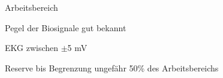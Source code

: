 \documentclass[a4paper]{article}
\begin{document}
\begin{multicols}{3}

  Arbeitsbereich
  \begin{itemize*}
    \item Pegel der Biosignale gut bekannt
    \item EKG zwischen $\pm$5 mV
    \item Reserve bis Begrenzung ungefähr 50\% des Arbeitsbereichs
  \end{itemize*}


\end{multicols}
\end{document}
